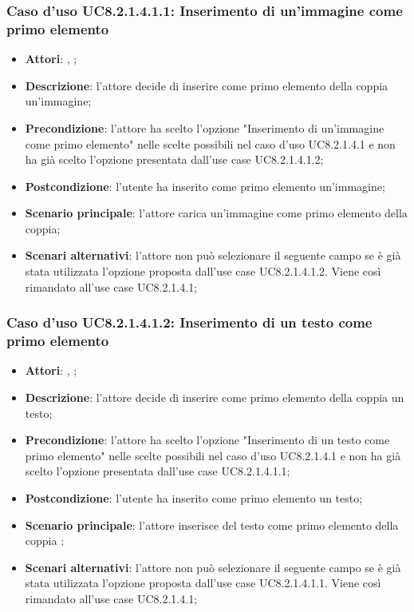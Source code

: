 		\subsubsection{Caso d'uso UC8.2.1.4.1.1: Inserimento di un'immagine come primo elemento}
		\label{UC8.2.1.4.1.1}
		\begin{itemize}
			\item \textbf{Attori}: \uau, \uaupro;
			\item \textbf{Descrizione}: l'attore decide di inserire come primo elemento della coppia un'immagine;
			\item \textbf{Precondizione}: l'attore ha scelto l'opzione "Inserimento di un'immagine come primo elemento" nelle scelte possibili nel caso d'uso UC8.2.1.4.1 e non ha già scelto l'opzione presentata dall'use case UC8.2.1.4.1.2;
			\item \textbf{Postcondizione}: l'utente ha inserito come primo elemento un'immagine;
			\item \textbf{Scenario principale}: l'attore carica un'immagine come primo elemento della coppia;  
			\item \textbf{Scenari alternativi}: l'attore non può selezionare il seguente campo se è già stata utilizzata l'opzione proposta dall'use case UC8.2.1.4.1.2. Viene così rimandato all'use case UC8.2.1.4.1;
		\end{itemize}
		
		\subsubsection{Caso d'uso UC8.2.1.4.1.2: Inserimento di un testo come primo elemento}
		\label{UC8.2.1.4.1.2}
		\begin{itemize}
			\item \textbf{Attori}: \uau, \uaupro;
			\item \textbf{Descrizione}: l'attore decide di inserire come primo elemento della coppia un testo;
			\item \textbf{Precondizione}: l'attore ha scelto l'opzione "Inserimento di un testo come primo elemento" nelle scelte possibili nel caso d'uso UC8.2.1.4.1 e non ha già scelto l'opzione presentata dall'use case UC8.2.1.4.1.1;
			\item \textbf{Postcondizione}: l'utente ha inserito come primo elemento un testo;
			\item \textbf{Scenario principale}: l'attore inserisce del testo come primo elemento della coppia ;  
			\item \textbf{Scenari alternativi}: l'attore non può selezionare il seguente campo se è già stata utilizzata l'opzione proposta dall'use case UC8.2.1.4.1.1. Viene così rimandato all'use case UC8.2.1.4.1;
		\end{itemize}
		
